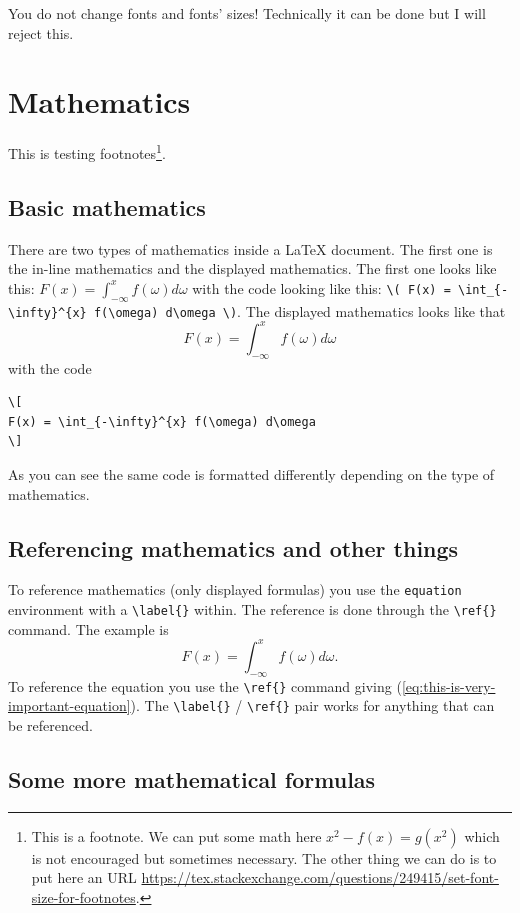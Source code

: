 \documentclass[english, twoside, 12pt, a4paper]{article}
\theoremstyle{definition}
\theoremstyle{plain}
\theoremstyle{remark}
\begin{document}
You do not change fonts and fonts' sizes! Technically it can be done but I will reject this.

\clearpage
\section{Mathematics}

This is testing footnotes\footnote{This is a footnote. We can put some math here \( x^2 - f(x) = g(x^2) \) which is not encouraged but sometimes necessary. The other thing we can do is to put here an URL \url{https://tex.stackexchange.com/questions/249415/set-font-size-for-footnotes}. }.

\subsection{Basic mathematics}

There are two types of mathematics inside a \LaTeX{} document. The first one is the in-line mathematics and the displayed mathematics. The first one looks like this: \( F(x) = \int_{-\infty}^{x} f(\omega) d\omega \) with the code looking like this: \verb!\( F(x) = \int_{-\infty}^{x} f(\omega) d\omega \)!. The displayed mathematics looks like that
\[
F(x) = \int_{-\infty}^{x} f(\omega) d\omega
\]
with the code
\begin{verbatim}
\[
F(x) = \int_{-\infty}^{x} f(\omega) d\omega
\]
\end{verbatim}
As you can see the same code is formatted differently depending on the type of mathematics.

\subsection{Referencing mathematics and other things}

To reference mathematics (only displayed formulas) you use the \verb+equation+ environment with a \verb+\label{}+ within. The reference is done through the \verb+\ref{}+ command. The example is
\begin{equation}
\label{eq:this-is-very-important-equation}
F(x) = \int_{-\infty}^{x} f(\omega) d\omega.
\end{equation}
To reference the equation you use the \verb+\ref{}+ command giving (\ref{eq:this-is-very-important-equation}). The \verb+\label{}+ / \verb+\ref{}+ pair works for anything that can be referenced.

\subsection{Some more mathematical formulas}
\end{document}
